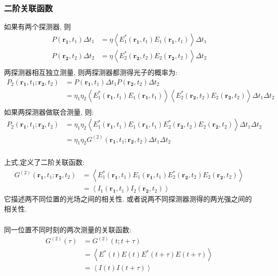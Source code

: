  \begin{frame}   
    \frametitle{二阶关联函数}
   如果有两个探测器, 则
    \[ \begin{aligned}
      P (\mathbf{r_1},t_1) \Delta t_1 &=\eta \left\langle E^*_1 (\mathbf{r_1},t_1) E_1 (\mathbf{r_1},t_1)\right\rangle \Delta t_1  \\
      P (\mathbf{r_2},t_2) \Delta t_2 &=\eta \left\langle E^*_2 (\mathbf{r_2},t_2) E_2 (\mathbf{r_2},t_2)\right\rangle  \Delta t_2  \\
     \end{aligned}\] 
    两探测器相互独立测量, 则两探测器都测得光子的概率为:
    \[ \begin{aligned}
        P_2 (\mathbf{r_1},t_1; \mathbf{r_2},t_2)  &= P (\mathbf{r_1},t_1) \Delta t_1 P (\mathbf{r_2},t_2) \Delta t_2\\
        &= \eta_1 \eta_2 \left\langle E^*_1 (\mathbf{r_1},t_1) E_1 (\mathbf{r_1},t_1)\right\rangle  \left\langle E^*_2 (\mathbf{r_2},t_2) E_2 (\mathbf{r_2},t_2)\right\rangle \Delta t_1 \Delta t_2 \\
    \end{aligned}\] 
    如果两探测器做联合测量, 则:
    \[ \begin{aligned}
        P_2 (\mathbf{r_1},t_1; \mathbf{r_2},t_2)  
        &= \eta_1 \eta_2 \left\langle E^*_1 (\mathbf{r_1},t_1) E_1 (\mathbf{r_1},t_1) E^*_2 (\mathbf{r_2},t_2) E_2 (\mathbf{r_2},t_2)\right\rangle \Delta t_1 \Delta t_2 \\
        &= \eta_1 \eta_2  G^{(2)} (\mathbf{r_1},t_1; \mathbf{r_2},t_2) \Delta t_1 \Delta t_2 
    \end{aligned}\]
\end{frame}

\begin{frame} 
 \frametitle{}
 上式,定义了二阶关联函数:
 \[ \boxed{ \begin{aligned}   
 G^{(2)} (\mathbf{r_1},t_1; \mathbf{r_2},t_2)  &= \left\langle E^*_1 (\mathbf{r_1},t_1) E_1 (\mathbf{r_1},t_1) E^*_2 (\mathbf{r_2},t_2) E_{2} (\mathbf{r_2},t_2)\right\rangle \\ 
 &= \left\langle I_1 (\mathbf{r_1},t_1) I_2 (\mathbf{r_2},t_2)\right\rangle
\end{aligned}} \]
它描述两不同位置的光场之间的相关性. 或者说两不同探测器测得的两光强之间的相关性. \\ 
\end{frame}

\begin{frame} 
\frametitle{}
同一位置不同时刻的两次测量的关联函数:
\[ \begin{aligned}
    G^{(2)}(\tau) &= G^{(2)}(t; t+ \tau) \\
    &= \left\langle E^* (t) E (t) E^* (t+ \tau) E (t+ \tau)\right\rangle \\
    &= \left\langle I (t)  I (t+ \tau)\right\rangle \\ 
\end{aligned}\] 
\end{frame}

